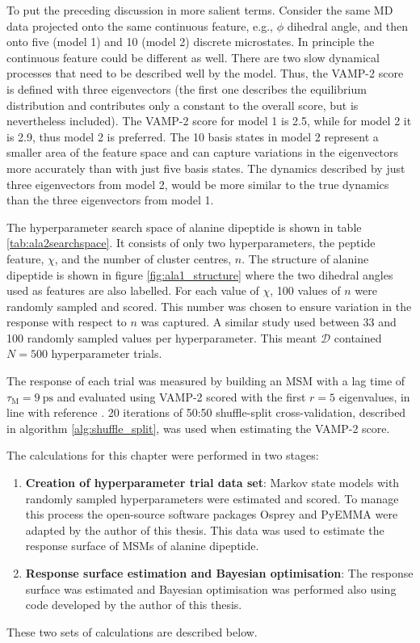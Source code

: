 To put the preceding discussion in more salient terms.  Consider the same MD data projected onto the same continuous feature, e.g., $\phi$ dihedral angle, and then onto five (model 1) and 10 (model 2) discrete microstates. In principle the continuous feature could be different as well.  There are two slow dynamical processes that need to be described well by the model. Thus, the VAMP-2 score is defined with three eigenvectors (the first one describes the equilibrium distribution and contributes only a constant to the overall score, but is nevertheless included).  The VAMP-2 score for model 1 is 2.5, while for model 2 it is 2.9, thus model 2 is preferred. The 10 basis states in model 2 represent a smaller area of the feature space and can capture variations in the eigenvectors more accurately than with just five basis states. The dynamics described by just three eigenvectors from model 2, would be more similar to the true dynamics than the three eigenvectors from model 1. 


The hyperparameter search space of alanine dipeptide is shown in table \ref{tab:ala2searchspace}. It consists of only two hyperparameters, the peptide feature, $\chi$, and the number of cluster centres, $n$.  The structure of alanine dipeptide is shown in figure \ref{fig:ala1_structure} where the two dihedral angles used as features are also labelled.  For each value of $\chi$, \num{100} values of $n$ were randomly sampled and scored. This number was chosen to ensure variation in the response with respect to $n$ was captured. A similar study \cite{husicOptimizedParameterSelection2016} used between \num{33} and \num{100} randomly sampled values per hyperparameter. This meant $\mathcal{D}$ contained $N=500$ hyperparameter trials.  

The response of each trial was measured by building an MSM with a lag time of $\tau_{\mathrm{M}} = \SI{9}{\pico\second}$ and evaluated using VAMP-2 scored with the first $r=5$ eigenvalues, in line with reference \cite{bowmanQuantitativeComparisonAlternative2013}. \num{20} iterations of 50:50 shuffle-split cross-validation, described in algorithm \ref{alg:shuffle_split}, was used when estimating the VAMP-2 score. 

The calculations for this chapter were performed in two stages: 
\begin{enumerate}
    \item \textbf{Creation of hyperparameter trial data set}: Markov state models with randomly sampled hyperparameters were estimated and scored. To manage this process the open-source software packages Osprey \cite{mcgibbonOspreyHyperparameterOptimization2016} and PyEMMA \cite{schererPyEMMASoftwarePackage2015a} were adapted by the author of this thesis.  This data was used to estimate the response surface of MSMs of alanine dipeptide. 
    \item \textbf{Response surface estimation and Bayesian optimisation}: The response surface was estimated and Bayesian optimisation was performed also using code developed by the author of this thesis. 
\end{enumerate}
These two sets of calculations are described below. 


